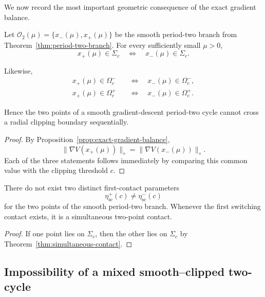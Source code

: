 We now record the most important geometric consequence of the exact
gradient balance.

\begin{theorem}
\label{thm:simultaneous-contact}
Let $\mathcal O_2(\mu)=\{x_-(\mu),x_+(\mu)\}$ be the smooth
period-two branch from
Theorem~\ref{thm:period-two-branch}.
For every sufficiently small $\mu>0$,
\begin{equation}
x_+(\mu)\in\Sigma_c
\quad\Longleftrightarrow\quad
x_-(\mu)\in\Sigma_c.
\label{eq:simultaneous-contact-equivalence}
\end{equation}

Likewise,
\begin{align}
x_+(\mu)\in\Omega_c^-
&\quad\Longleftrightarrow\quad
x_-(\mu)\in\Omega_c^-,
\label{eq:simultaneous-smooth}
\\
x_+(\mu)\in\Omega_c^+
&\quad\Longleftrightarrow\quad
x_-(\mu)\in\Omega_c^+.
\label{eq:simultaneous-clipped}
\end{align}

Hence the two points of a smooth gradient-descent period-two cycle
cannot cross a radial clipping boundary sequentially.
\end{theorem}

\begin{proof}
By Proposition~\ref{prop:exact-gradient-balance},
\[
\|\nabla V(x_+(\mu))\|_\diamond
=
\|\nabla V(x_-(\mu))\|_\diamond.
\]
Each of the three statements follows immediately by comparing this
common value with the clipping threshold $c$.
\end{proof}

\begin{corollary}
\label{cor:no-contact-splitting}
There do not exist two distinct first-contact parameters
\[
\eta_{\mathrm{sc}}^+(c)
\neq
\eta_{\mathrm{sc}}^-(c)
\]
for the two points of the smooth period-two branch.
Whenever the first switching contact exists, it is a simultaneous
two-point contact.
\end{corollary}

\begin{proof}
If one point lies on $\Sigma_c$, then the other lies on $\Sigma_c$
by Theorem~\ref{thm:simultaneous-contact}.
\end{proof}

\subsection{Impossibility of a mixed smooth--clipped two-cycle}
\label{subsec:no-mixed-two-cycle}

